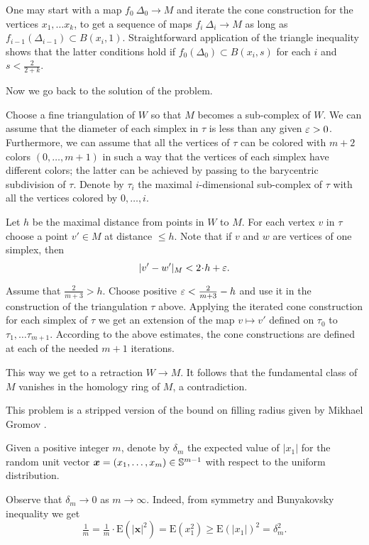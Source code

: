 One may start with a map $f_0\:\Delta_0\to M$ and iterate the cone construction for the vertices $x_1,\dots x_k$,
to get a sequence of maps $f_i\:\Delta_i\to M$
as long as $f_{i-1}(\Delta_{i-1})\subset B(x_i,1)$.
Straightforward application of the triangle inequality 
shows that the latter conditions hold if 
$f_0(\Delta_0)\subset B(x_i,s)$ for each $i$ and $s<\tfrac2{2+k}$.

\medskip

Now we go back to the solution of the problem.

Choose a fine triangulation of $W$ so that $M$ becomes a sub-complex of $W$.
We can assume that the diameter of each simplex in $\tau$ is less than any given
$\varepsilon>0$.
Furthermore, we can assume that all the vertices of $\tau$ can be colored with $m+2$ colors $(0,\dots, m+1)$
in such a way that the vertices of each simplex 
have different colors;
the latter can be achieved by passing to the barycentric subdivision of $\tau$.
Denote by $\tau_i$ the maximal $i$-dimensional sub-complex of $\tau$ 
with all the vertices colored by $0,\dots, i$.

Let $h$ be the maximal distance from points in $W$ to $M$.
For each vertex $v$ in $\tau$ 
choose a point $v'\in M$ at distance $\le h$.
Note that 
if $v$ and $w$ are vertices of one simplex,
then
\[|v'-w'|_M<2\cdot h+\eps.\]

Assume that $\tfrac{2}{m+3}>h$.
Choose positive $\varepsilon<\tfrac{2}{m+3}-h$ and use it in the construction of the triangulation $\tau$ above.
Applying the iterated cone construction for each simplex of $\tau$
we get an extension of the map $v\mapsto v'$ defined on $\tau_0$ to $\tau_1,\dots\tau_{m+1}$.
According to the above estimates, the cone constructions are defined at each of the needed $m+1$ iterations.

This way we get 
to a retraction $W\to M$.
It follows that the fundamental class of $M$ vanishes in the homology ring of $M$, 
a contradiction. 
\qeds


This problem is a stripped version of the bound on filling radius given by Mikhael Gromov \cite{gromov-filling}.  

Given a positive integer $m$,
denote by $\delta_m$ 
the expected value of $|x_1|$ for the random unit vector 
$\bm{x}\z=(x_1,\dots,x_m)\z\in\mathbb{S}^{m-1}$ 
with respect to the uniform distribution.

Observe that $\delta_m\to 0$ as $m\to\infty$.
Indeed, from symmetry and Bunyakovsky inequality we get
\[
\tfrac1m=\tfrac1m\cdot\mathrm{E}(|\bm{x}|^2)
=\mathrm{E}(x_1^2)\ge \mathrm{E}(|x_1|)^2=\delta_m^2.
\]


